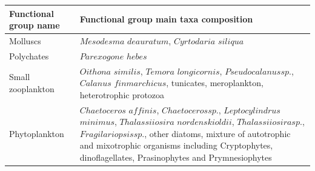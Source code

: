\begin{singlespace}
\newpage
\begin{table}[h!]
    \centering
    \small
    \begin{tabularx}{1\textwidth}{|s|b|}
        \hline
        Functional group name   & Functional group main taxa composition    \\
        \hline \hline
        Molluscs                           & $Mesodesma$ $deauratum$, $Cyrtodaria$ $siliqua$    \\
        \hline
        Polychates                         & $Parexogone$ $hebes$   \\
        \hline
        Small zooplankton                  & $Oithona$ $similis$, $Temora$ $longicornis$, $Pseudocalanus sp.$, $Calanus$ $finmarchicus$, tunicates, meroplankton, heterotrophic protozoa    \\
        \hline
        Phytoplankton                      & $Chaetoceros$ $affinis$, $Chaetoceros sp.$, $Leptocylindrus$ $minimus$, $Thalassiiosira$ $nordenskioldii$, $Thalassiiosira sp.$, $Fragilariopsis sp.$, other diatoms, mixture of autotrophic and mixotrophic organisms including Cryptophytes, dinoflagellates, Prasinophytes and Prymnesiophytes  \\
        \hline
  \end{tabularx}
\end{table}


\end{singlespace}
